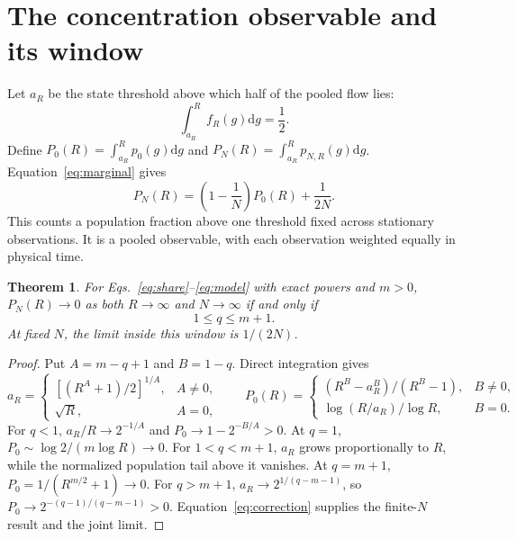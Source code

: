 \documentclass[11pt,a4paper]{article}
\newtheorem{theorem}{Theorem}
\newcommand{\dd}{\mathrm{d}}
\begin{document}
\section{The concentration observable and its window}

Let $a_R$ be the state threshold above which half of the pooled flow lies:
\begin{equation}
 \int_{a_R}^R f_R(g)\dd g=\frac12.
\end{equation}
Define $P_0(R)=\int_{a_R}^R p_0(g)\dd g$ and
$P_N(R)=\int_{a_R}^R p_{N,R}(g)\dd g$. Equation~\eqref{eq:marginal} gives
\begin{equation}
 \boxed{P_N(R)=\left(1-\frac1N\right)P_0(R)+\frac{1}{2N}.}
 \label{eq:correction}
\end{equation}
This counts a population fraction above one threshold fixed across stationary
observations. It is a pooled observable, with each observation weighted equally
in physical time.

\begin{theorem}
For Eqs.~\eqref{eq:share}--\eqref{eq:model} with exact powers and $m>0$,
$P_N(R)\to0$ as both $R\to\infty$ and $N\to\infty$ if and only if
\begin{equation}
 \boxed{1\leq q\leq m+1.}
 \label{eq:window}
\end{equation}
At fixed $N$, the limit inside this window is $1/(2N)$.
\end{theorem}

\begin{proof}
Put $A=m-q+1$ and $B=1-q$. Direct integration gives
\begin{equation}
 a_R=\begin{cases}
 [(R^A+1)/2]^{1/A},&A\ne0,\\
 \sqrt R,&A=0,
 \end{cases}\qquad
 P_0(R)=\begin{cases}
 (R^B-a_R^B)/(R^B-1),&B\ne0,\\
 \log(R/a_R)/\log R,&B=0.
 \end{cases}
 \label{eq:quantile}
\end{equation}
For $q<1$, $a_R/R\to2^{-1/A}$ and
$P_0\to1-2^{-B/A}>0$. At $q=1$,
$P_0\sim\log2/(m\log R)\to0$. For $1<q<m+1$, $a_R$ grows proportionally
to $R$, while the normalized population tail above it vanishes.
At $q=m+1$, $P_0=1/(R^{m/2}+1)\to0$.
For $q>m+1$, $a_R\to2^{1/(q-m-1)}$, so
$P_0\to2^{-(q-1)/(q-m-1)}>0$.
Equation~\eqref{eq:correction} supplies the finite-$N$ result and the joint limit.
\end{proof}
\end{document}
